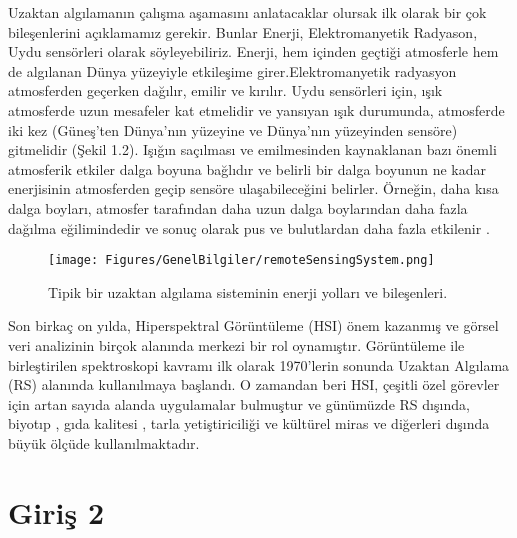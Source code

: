 Uzaktan algılamanın çalışma aşamasını anlatacaklar olursak ilk olarak bir çok bileşenlerini açıklamamız gerekir. Bunlar Enerji, Elektromanyetik Radyason, Uydu sensörleri olarak söyleyebiliriz.
Enerji, hem içinden geçtiği atmosferle hem de algılanan Dünya yüzeyiyle etkileşime girer.Elektromanyetik radyasyon atmosferden geçerken dağılır, emilir ve kırılır. Uydu sensörleri için, ışık atmosferde uzun mesafeler kat etmelidir ve yansıyan ışık durumunda, atmosferde iki kez (Güneş'ten Dünya'nın yüzeyine ve Dünya'nın yüzeyinden sensöre) gitmelidir (Şekil 1.2).
Işığın saçılması ve emilmesinden kaynaklanan bazı önemli atmosferik etkiler dalga boyuna bağlıdır ve belirli bir dalga boyunun ne kadar enerjisinin atmosferden geçip sensöre ulaşabileceğini belirler. Örneğin, daha kısa dalga boyları, atmosfer tarafından daha uzun dalga boylarından daha fazla dağılma eğilimindedir ve sonuç olarak pus ve bulutlardan daha fazla etkilenir \cite{READ2009335}.

\begin{figure}[!ht]
  \centering
  \texttt{[image: Figures/GenelBilgiler/remoteSensingSystem.png]}
  \caption{Tipik bir uzaktan algılama sisteminin enerji yolları ve bileşenleri. }
\end{figure}


Son birkaç on yılda, Hiperspektral Görüntüleme (HSI) önem kazanmış ve görsel veri analizinin birçok alanında merkezi bir rol oynamıştır. Görüntüleme ile birleştirilen spektroskopi kavramı ilk olarak 1970'lerin sonunda Uzaktan Algılama (RS) alanında \cite{goetz1985imaging} kullanılmaya başlandı. O zamandan beri HSI, çeşitli özel görevler için artan sayıda alanda uygulamalar bulmuştur ve günümüzde RS \cite{eismann2012hyperspectral} dışında, biyotıp \cite{lu2014medical}, gıda kalitesi \cite{sun2010hyperspectral}, tarla yetiştiriciliği \cite{kamilaris2018deep, lowe2017hyperspectral} ve kültürel miras \cite{fischer2006multispectral} ve diğerleri \cite{khan2018modern} dışında büyük ölçüde kullanılmaktadır.

\section{Giriş 2}

